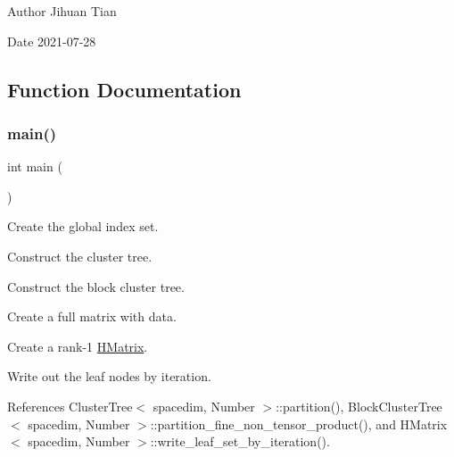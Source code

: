 \begin{DoxyAuthor}{Author}
Jihuan Tian 
\end{DoxyAuthor}
\begin{DoxyDate}{Date}
2021-\/07-\/28 
\end{DoxyDate}


\subsection{Function Documentation}
\mbox{\label{hmatrix-write-leaf-set-by-iteration_8cc_ae66f6b31b5ad750f1fe042a706a4e3d4}} 
\subsubsection{\texorpdfstring{main()}{main()}}
{\footnotesize\ttfamily int main (\begin{DoxyParamCaption}{ }\end{DoxyParamCaption})}

Create the global index set.

Construct the cluster tree.

Construct the block cluster tree.

Create a full matrix with data.

Create a rank-\/1 \hyperlink{classHMatrix}{H\+Matrix}.

Write out the leaf nodes by iteration.

References Cluster\+Tree$<$ spacedim, Number $>$\+::partition(), Block\+Cluster\+Tree$<$ spacedim, Number $>$\+::partition\+\_\+fine\+\_\+non\+\_\+tensor\+\_\+product(), and H\+Matrix$<$ spacedim, Number $>$\+::write\+\_\+leaf\+\_\+set\+\_\+by\+\_\+iteration().

